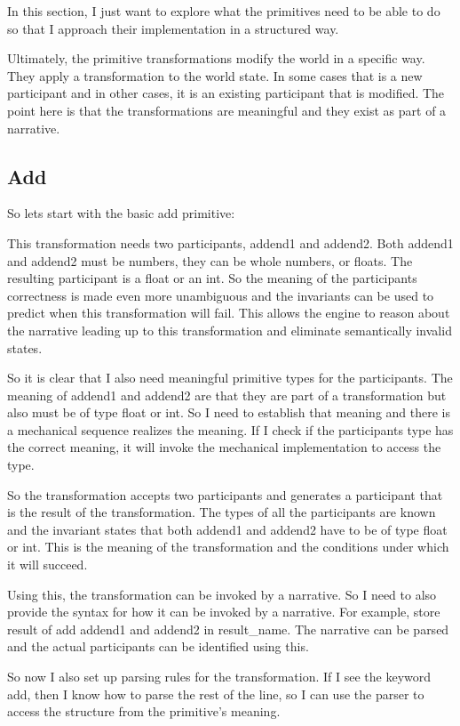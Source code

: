 In this section, I just want to explore what the primitives need to be able to do so that I approach their implementation in a structured way. 

Ultimately, the primitive transformations modify the world in a specific way. They apply a transformation to the world state. In some cases that is a new participant and in other cases, it is an existing participant that is modified. The point here is that the transformations are meaningful and they exist as part of a narrative. 

\subsection{Add}
So lets start with the basic add primitive:

This transformation needs two participants, addend1 and addend2. Both addend1 and addend2 must be numbers, they can be whole numbers, or floats. The resulting participant is a float or an int. So the meaning of the participants correctness is made even more unambiguous and the invariants can be used to predict when this transformation will fail. This allows the engine to reason about the narrative leading up to this transformation and eliminate semantically invalid states.

So it is clear that I also need meaningful primitive types for the participants. The meaning of addend1 and addend2 are that they are part of a transformation but also must be of type float or int. So I need to establish that meaning and there is a mechanical sequence realizes the meaning. If I check if the participants type has the correct meaning, it will invoke the mechanical implementation to access the type.

So the transformation accepts two participants and generates a participant that is the result of the transformation. The types of all the participants are known and the invariant states that both addend1 and addend2 have to be of type float or int. This is the meaning of the transformation and the conditions under which it will succeed.

Using this, the transformation can be invoked by a narrative. So I need to also provide the syntax for how it can be invoked by a narrative. For example, store result of add {addend1} and {addend2} in {result\_name}. The narrative can be parsed and the actual participants can be identified using this.

So now I also set up parsing rules for the transformation. If I see the keyword add, then I know how to parse the rest of the line, so I can use the parser to access the structure from the primitive's meaning.

